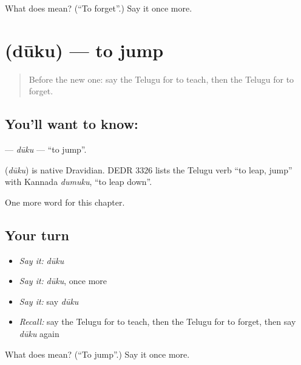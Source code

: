 \begin{tcolorbox}[breakable,colback=teal!4,colframe=teal!35!black,title={Before you move on}]
What does  mean? (\textquotedblleft{}To forget\textquotedblright{}.) Say it once more.
\end{tcolorbox}
\section[\texorpdfstring{\te{దూకు} (dūku)}{దూకు (dūku)}]{ (dūku) — to jump}

\label{lesson:TE-C145-duku}



\begin{quote}
Before the new one: say the Telugu for to teach, then the Telugu for to forget.
\end{quote}

\subsection*{You'll want to know: }
\textbf{} — \emph{dūku} — \textquotedblleft{}to jump\textquotedblright{}.

\begin{cousinweb}
\textbf{} (\emph{dūku}) is native Dravidian. DEDR 3326 lists the Telugu verb \textquotedblleft{}to leap, jump\textquotedblright{} with Kannada \emph{dumuku}, \textquotedblleft{}to leap down\textquotedblright{}.
\end{cousinweb}

\begin{grammarlens}[title={What you've built}]
One more word for this chapter.
\end{grammarlens}

\subsection*{Your turn}
\begin{itemize}
\raggedright
  \item \emph{Say it:} \emph{dūku}
  \item \emph{Say it:} \emph{dūku}, once more
  \item \emph{Say it:} say \emph{dūku}
  \item \emph{Recall:} say the Telugu for to teach, then the Telugu for to forget, then say \emph{dūku} again
\end{itemize}

\begin{tcolorbox}[breakable,colback=teal!4,colframe=teal!35!black,title={Before you move on}]
What does  mean? (\textquotedblleft{}To jump\textquotedblright{}.) Say it once more.
\end{tcolorbox}
